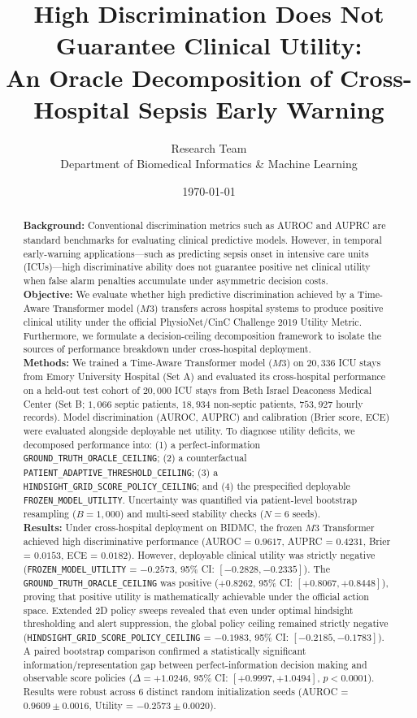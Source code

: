 \documentclass[11pt,a4paper]{article}
\title{\textbf{High Discrimination Does Not Guarantee Clinical Utility:\\An Oracle Decomposition of Cross-Hospital Sepsis Early Warning}}
\author{
  Research Team\\
  \small Department of Biomedical Informatics \& Machine Learning\\
}
\date{\today}
\begin{document}
\maketitle

\begin{abstract}
\textbf{Background:} Conventional discrimination metrics such as AUROC and AUPRC are standard benchmarks for evaluating clinical predictive models. However, in temporal early-warning applications---such as predicting sepsis onset in intensive care units (ICUs)---high discriminative ability does not guarantee positive net clinical utility when false alarm penalties accumulate under asymmetric decision costs.\\[0.5em]
\textbf{Objective:} We evaluate whether high predictive discrimination achieved by a Time-Aware Transformer model ($M3$) transfers across hospital systems to produce positive clinical utility under the official PhysioNet/CinC Challenge 2019 Utility Metric. Furthermore, we formulate a decision-ceiling decomposition framework to isolate the sources of performance breakdown under cross-hospital deployment.\\[0.5em]
\textbf{Methods:} We trained a Time-Aware Transformer model ($M3$) on $20,336$ ICU stays from Emory University Hospital (Set A) and evaluated its cross-hospital performance on a held-out test cohort of $20,000$ ICU stays from Beth Israel Deaconess Medical Center (Set B; $1,066$ septic patients, $18,934$ non-septic patients, $753,927$ hourly records). Model discrimination (AUROC, AUPRC) and calibration (Brier score, ECE) were evaluated alongside deployable net utility. To diagnose utility deficits, we decomposed performance into: (1) a perfect-information \texttt{GROUND\_TRUTH\_ORACLE\_CEILING}; (2) a counterfactual \texttt{PATIENT\_ADAPTIVE\_THRESHOLD\_CEILING}; (3) a \texttt{HINDSIGHT\_GRID\_SCORE\_POLICY\_CEILING}; and (4) the prespecified deployable \texttt{FROZEN\_MODEL\_UTILITY}. Uncertainty was quantified via patient-level bootstrap resampling ($B = 1,000$) and multi-seed stability checks ($N = 6$ seeds).\\[0.5em]
\textbf{Results:} Under cross-hospital deployment on BIDMC, the frozen $M3$ Transformer achieved high discriminative performance (AUROC = $0.9617$, AUPRC = $0.4231$, Brier = $0.0153$, ECE = $0.0182$). However, deployable clinical utility was strictly negative (\texttt{FROZEN\_MODEL\_UTILITY} = $-0.2573$, 95\% CI: $[-0.2828, -0.2335]$). The \texttt{GROUND\_TRUTH\_ORACLE\_CEILING} was positive ($+0.8262$, 95\% CI: $[+0.8067, +0.8448]$), proving that positive utility is mathematically achievable under the official action space. Extended 2D policy sweeps revealed that even under optimal hindsight thresholding and alert suppression, the global policy ceiling remained strictly negative (\texttt{HINDSIGHT\_GRID\_SCORE\_POLICY\_CEILING} = $-0.1983$, 95\% CI: $[-0.2185, -0.1783]$). A paired bootstrap comparison confirmed a statistically significant information/representation gap between perfect-information decision making and observable score policies ($\Delta = +1.0246$, 95\% CI: $[+0.9997, +1.0494]$, $p < 0.0001$). Results were robust across $6$ distinct random initialization seeds (AUROC = $0.9609 \pm 0.0016$, Utility = $-0.2573 \pm 0.0020$).\\[0.5em]

\end{abstract}
\end{document}

